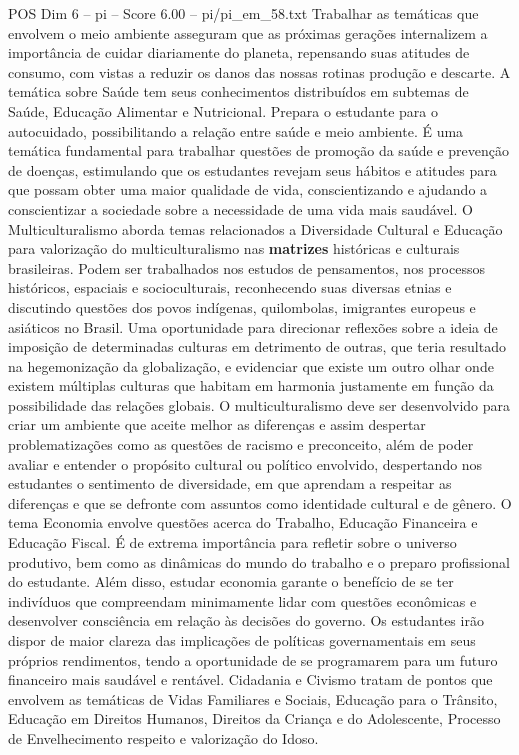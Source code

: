 \begin{textsample}{POS Dim 6 – pi – Score 6.00 – pi/pi\_em\_58.txt}
Trabalhar as temáticas que envolvem o meio ambiente asseguram que as próximas gerações internalizem a importância de cuidar diariamente do planeta, repensando suas atitudes de consumo, com vistas a reduzir os danos das nossas rotinas produção e descarte.
A temática sobre Saúde tem seus conhecimentos distribuídos em subtemas de Saúde, Educação Alimentar e Nutricional.
Prepara o estudante para o autocuidado, possibilitando a relação entre saúde e meio ambiente.
É uma temática fundamental para trabalhar questões de promoção da saúde e prevenção de doenças, estimulando que os estudantes revejam seus hábitos e atitudes para que possam obter uma maior qualidade de vida, conscientizando e ajudando a conscientizar a sociedade sobre a necessidade de uma vida mais saudável.
O Multiculturalismo aborda temas relacionados a Diversidade Cultural e Educação para valorização do multiculturalismo nas \textbf{matrizes} históricas e culturais brasileiras.
Podem ser trabalhados nos estudos de pensamentos, nos processos históricos, espaciais e socioculturais, reconhecendo suas diversas etnias e discutindo questões dos povos indígenas, quilombolas, imigrantes europeus e asiáticos no Brasil.
Uma oportunidade para direcionar reflexões sobre a ideia de imposição de determinadas culturas em detrimento de outras, que teria resultado na hegemonização da globalização, e evidenciar que existe um outro olhar onde existem múltiplas culturas que habitam em harmonia justamente em função da possibilidade das relações globais.
O multiculturalismo deve ser desenvolvido para criar um ambiente que aceite melhor as diferenças e assim despertar problematizações como as questões de racismo e preconceito, além de poder avaliar e entender o propósito cultural ou político envolvido, despertando nos estudantes o sentimento de diversidade, em que aprendam a respeitar as diferenças e que se defronte com assuntos como identidade cultural e de gênero.
O tema Economia envolve questões acerca do Trabalho, Educação Financeira e Educação Fiscal.
É de extrema importância para refletir sobre o universo produtivo, bem como as dinâmicas do mundo do trabalho e o preparo profissional do estudante.
Além disso, estudar economia garante o benefício de se ter indivíduos que compreendam minimamente lidar com questões econômicas e desenvolver consciência em relação às decisões do governo.
Os estudantes irão dispor de maior clareza das implicações de políticas governamentais em seus próprios rendimentos, tendo a oportunidade de se programarem para um futuro financeiro mais saudável e rentável.
Cidadania e Civismo tratam de pontos que envolvem as temáticas de Vidas Familiares e Sociais, Educação para o Trânsito, Educação em Direitos Humanos, Direitos da Criança e do Adolescente, Processo de Envelhecimento respeito e valorização do Idoso.

\end{textsample}
